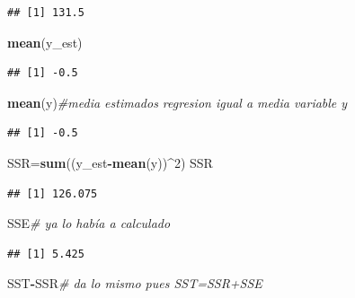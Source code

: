 \documentclass[
]{article}
\newenvironment{Shaded}{\begin{snugshade}}{\end{snugshade}}
\newcommand{\CommentTok}[1]{\textcolor[rgb]{0.56,0.35,0.01}{\textit{#1}}}
\newcommand{\DecValTok}[1]{\textcolor[rgb]{0.00,0.00,0.81}{#1}}
\newcommand{\KeywordTok}[1]{\textcolor[rgb]{0.13,0.29,0.53}{\textbf{#1}}}
\newcommand{\NormalTok}[1]{#1}
\newcommand{\OperatorTok}[1]{\textcolor[rgb]{0.81,0.36,0.00}{\textbf{#1}}}
\begin{document}
\begin{verbatim}
## [1] 131.5
\end{verbatim}

\begin{Shaded}
\begin{Highlighting}[]
\KeywordTok{mean}\NormalTok{(y_est)}
\end{Highlighting}
\end{Shaded}

\begin{verbatim}
## [1] -0.5
\end{verbatim}

\begin{Shaded}
\begin{Highlighting}[]
\KeywordTok{mean}\NormalTok{(y)}\CommentTok{#media estimados regresion igual a media variable y}
\end{Highlighting}
\end{Shaded}

\begin{verbatim}
## [1] -0.5
\end{verbatim}

\begin{Shaded}
\begin{Highlighting}[]
\NormalTok{SSR=}\KeywordTok{sum}\NormalTok{((y_est}\OperatorTok{-}\KeywordTok{mean}\NormalTok{(y))}\OperatorTok{^}\DecValTok{2}\NormalTok{)}
\NormalTok{SSR}
\end{Highlighting}
\end{Shaded}

\begin{verbatim}
## [1] 126.075
\end{verbatim}

\begin{Shaded}
\begin{Highlighting}[]
\NormalTok{SSE}\CommentTok{# ya lo había a calculado}
\end{Highlighting}
\end{Shaded}

\begin{verbatim}
## [1] 5.425
\end{verbatim}

\begin{Shaded}
\begin{Highlighting}[]
\NormalTok{SST}\OperatorTok{-}\NormalTok{SSR}\CommentTok{# da lo mismo pues SST=SSR+SSE }
\end{Highlighting}
\end{Shaded}
\end{document}
